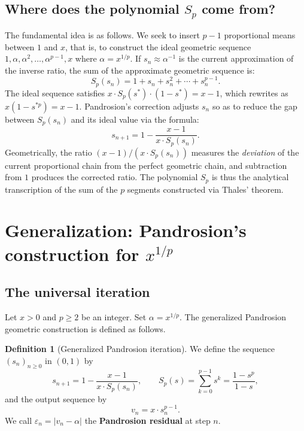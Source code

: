\documentclass[10pt,a4paper,oneside]{book}
\theoremstyle{definition}
\newtheorem{definition}[theorem]{Definition}
\theoremstyle{remark}
\newcommand{\eps}{\varepsilon}
\begin{document}
\subsection{Where does the polynomial $S_p$ come from?}

The fundamental idea is as follows. We seek to insert $p-1$ proportional means between $1$ and $x$, that is, to construct the ideal geometric sequence $1, \alpha, \alpha^2, \ldots, \alpha^{p-1}, x$ where $\alpha = x^{1/p}$. If $s_n \approx \alpha^{-1}$ is the current approximation of the inverse ratio, the sum of the approximate geometric sequence is:
\[
  S_p(s_n) = 1 + s_n + s_n^2 + \cdots + s_n^{p-1}.
\]
The ideal sequence satisfies $x \cdot S_p(s^*) \cdot (1-s^*) = x-1$, which rewrites as $x(1-s^{*p}) = x-1$. Pandrosion's correction adjusts $s_n$ so as to reduce the gap between $S_p(s_n)$ and its ideal value via the formula:
\[
  s_{n+1} = 1 - \frac{x-1}{x \cdot S_p(s_n)}.
\]
Geometrically, the ratio $(x-1)/(x \cdot S_p(s_n))$ measures the \emph{deviation} of the current proportional chain from the perfect geometric chain, and subtraction from $1$ produces the corrected ratio. The polynomial $S_p$ is thus the analytical transcription of the sum of the $p$ segments constructed via Thales' theorem.

\section{Generalization: Pandrosion's construction for \texorpdfstring{$x^{1/p}$}{x\^{}(1/p)}}
\label{sec:generalisation}

\subsection{The universal iteration}

Let $x > 0$ and $p \geq 2$ be an integer. Set $\alpha = x^{1/p}$. The generalized Pandrosion geometric construction is defined as follows.

\begin{definition}[Generalized Pandrosion iteration]
\label{def:pandrosion_gen}
We define the sequence $(s_n)_{n \geq 0}$ in $(0, 1)$ by
\begin{equation}
  \label{eq:pandrosion_gen}
  s_{n+1} = 1 - \frac{x - 1}{x \cdot S_p(s_n)},
  \qquad
  S_p(s) = \sum_{k=0}^{p-1} s^k = \frac{1 - s^p}{1 - s},
\end{equation}
and the output sequence by
\begin{equation}
  \label{eq:vn_gen}
  v_n = x \cdot s_n^{p-1}.
\end{equation}
We call $\eps_n = |v_n - \alpha|$ the \textbf{Pandrosion residual} at step $n$.
\end{definition}
\end{document}
